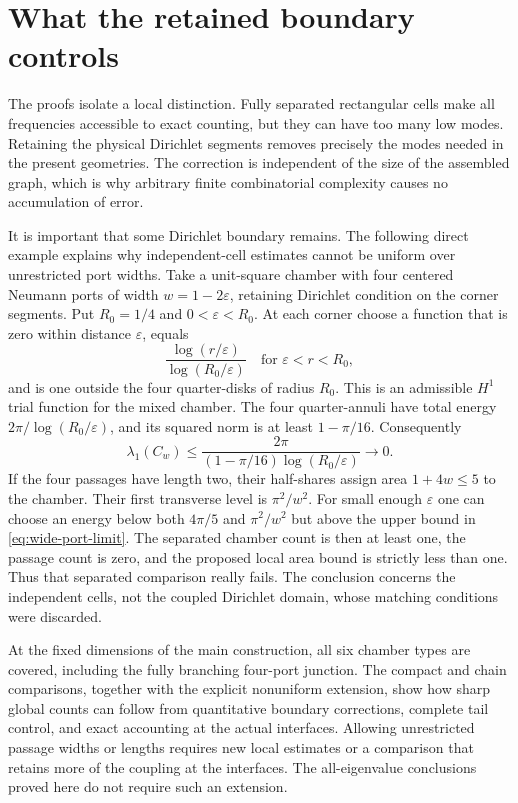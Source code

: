 \documentclass[11pt,reqno]{amsart}
\numberwithin{equation}{section}
\begin{document}
\section{What the retained boundary controls}\label{sec:limits}

The proofs isolate a local distinction. Fully separated
rectangular cells make all frequencies accessible to exact
counting, but they can have too many low modes. Retaining the
physical Dirichlet segments removes precisely the modes needed
in the present geometries. The correction is independent of
the size of the assembled graph, which is why arbitrary finite
combinatorial complexity causes no accumulation of error.

It is important that some Dirichlet boundary remains. The
following direct example explains why independent-cell
estimates cannot be uniform over unrestricted port widths.
Take a unit-square chamber with four centered Neumann ports
of width $w=1-2\varepsilon$, retaining Dirichlet condition on
the corner segments. Put $R_0=1/4$ and $0<\varepsilon<R_0$.
At each corner choose a function that is zero within distance
$\varepsilon$, equals
\[
 \frac{\log(r/\varepsilon)}{\log(R_0/\varepsilon)}
 \quad\text{for }\varepsilon<r<R_0,
\]
and is one outside the four quarter-disks of radius $R_0$.
This is an admissible $H^1$ trial function for the mixed chamber.
The four quarter-annuli have total energy
$2\pi/\log(R_0/\varepsilon)$, and its squared norm is at least
$1-\pi/16$. Consequently
\begin{equation}\label{eq:wide-port-limit}
 \lambda_1(C_w)\le
 \frac{2\pi}{(1-\pi/16)\log(R_0/\varepsilon)}\longrightarrow0.
\end{equation}
If the four passages have length two, their half-shares assign
area $1+4w\le5$ to the chamber. Their first transverse level
is $\pi^2/w^2$. For small enough $\varepsilon$ one can choose
an energy below both $4\pi/5$ and $\pi^2/w^2$ but above the
upper bound in \eqref{eq:wide-port-limit}. The separated
chamber count is then at least one, the passage count is zero,
and the proposed local area bound is strictly less than one.
Thus that separated comparison really fails. The conclusion
concerns the independent cells, not the coupled Dirichlet
domain, whose matching conditions were discarded.

At the fixed dimensions of the main construction, all six
chamber types are covered, including the fully branching
four-port junction. The compact and chain comparisons, together with
the explicit nonuniform extension, show how sharp global counts can
follow from quantitative boundary corrections, complete tail control,
and exact accounting at the actual interfaces.
Allowing unrestricted passage widths or lengths requires new local estimates
or a comparison that retains more of the coupling at the
interfaces. The all-eigenvalue conclusions proved here do
not require such an extension.
\end{document}
